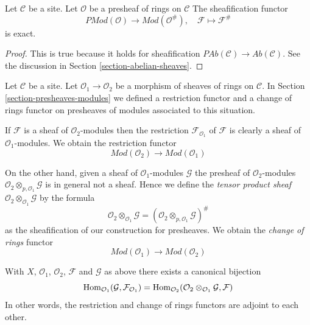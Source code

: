 \begin{lemma}
\label{lemma-sheafification-exact}
Let $\mathcal{C}$ be a site.
Let $\mathcal{O}$ be a presheaf of rings on $\mathcal{C}$
The sheafification functor
$$
\textit{PMod}(\mathcal{O}) \longrightarrow \textit{Mod}(\mathcal{O}^\#), \quad
\mathcal{F} \longmapsto \mathcal{F}^\#
$$
is exact.
\end{lemma}

\begin{proof}
This is true because it holds for sheafification
$\textit{PAb}(\mathcal{C}) \to \textit{Ab}(\mathcal{C})$.
See the discussion in Section \ref{section-abelian-sheaves}.
\end{proof}

\noindent
Let $\mathcal{C}$ be a site.
Let $\mathcal{O}_1 \to \mathcal{O}_2$ be
a morphism of sheaves of rings on $\mathcal{C}$.
In Section \ref{section-presheaves-modules}
we defined a restriction functor
and a change of rings functor on presheaves of modules
associated to this situation.

\medskip\noindent
If $\mathcal{F}$ is a sheaf of $\mathcal{O}_2$-modules
then the restriction $\mathcal{F}_{\mathcal{O}_1}$
of $\mathcal{F}$ is clearly a sheaf
of $\mathcal{O}_1$-modules. We obtain the restriction functor
$$
\textit{Mod}(\mathcal{O}_2)
\longrightarrow
\textit{Mod}(\mathcal{O}_1)
$$

\medskip\noindent
On the other hand, given a sheaf of $\mathcal{O}_1$-modules
$\mathcal{G}$ the presheaf of $\mathcal{O}_2$-modules
$\mathcal{O}_2 \otimes_{p, \mathcal{O}_1} \mathcal{G}$
is in general not a sheaf. Hence we define the
{\it tensor product sheaf}
$\mathcal{O}_2 \otimes_{\mathcal{O}_1} \mathcal{G}$
by the formula
$$
\mathcal{O}_2 \otimes_{\mathcal{O}_1} \mathcal{G}
=
(\mathcal{O}_2 \otimes_{p, \mathcal{O}_1} \mathcal{G})^\#
$$
as the sheafification of our construction for presheaves.
We obtain the {\it change of rings} functor
$$
\textit{Mod}(\mathcal{O}_1)
\longrightarrow
\textit{Mod}(\mathcal{O}_2)
$$

\begin{lemma}
\label{lemma-adjointness-tensor-restrict}
With $X$, $\mathcal{O}_1$, $\mathcal{O}_2$, $\mathcal{F}$ and
$\mathcal{G}$ as above there exists a canonical bijection
$$
\mathop{\mathrm{Hom}}\nolimits_{\mathcal{O}_1}(\mathcal{G}, \mathcal{F}_{\mathcal{O}_1})
=
\mathop{\mathrm{Hom}}\nolimits_{\mathcal{O}_2}(
\mathcal{O}_2 \otimes_{\mathcal{O}_1} \mathcal{G},
\mathcal{F}
)
$$
In other words, the restriction and change of rings functors
are adjoint to each other.
\end{lemma}

